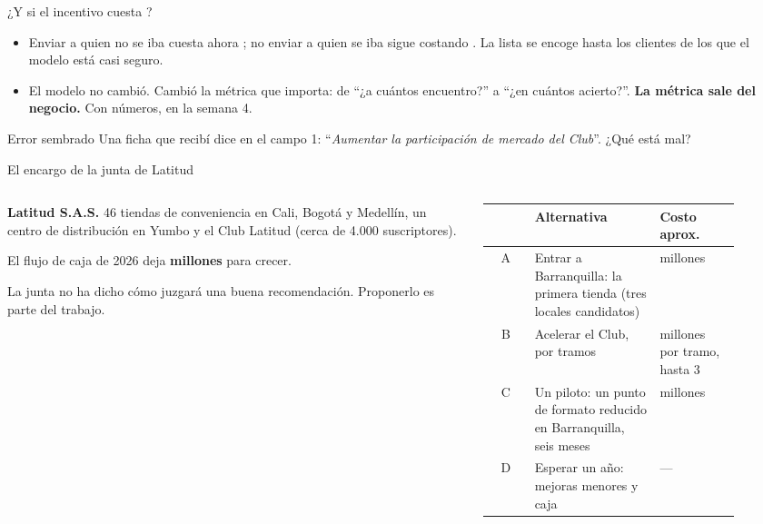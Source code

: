 \documentclass{beamer}
\begin{document}
\begin{frame}{¿Y si el incentivo cuesta ?}
\small
\begin{itemize}\itemsep3pt
  \item Enviar a quien no se iba cuesta ahora ; no enviar a quien se iba sigue costando . La lista se encoge hasta los clientes de los que el modelo está casi seguro.
  \item El modelo no cambió. Cambió la métrica que importa: de ``¿a cuántos encuentro?'' a ``¿en cuántos acierto?''. \textbf{La métrica sale del negocio.} Con números, en la semana 4.
\end{itemize}
\begin{alertblock}{Error sembrado}
Una ficha que recibí dice en el campo 1: ``\emph{Aumentar la participación de mercado del Club}''. ¿Qué está mal?
\end{alertblock}
\end{frame}

\begin{frame}{El encargo de la junta de Latitud}
\begin{columns}[T]
\begin{column}{0.45\textwidth}
\textbf{Latitud S.A.S.} 46 tiendas de conveniencia en Cali, Bogotá y Medellín, un centro de distribución en Yumbo y el Club Latitud (cerca de 4.000 suscriptores).

\medskip
El flujo de caja de 2026 deja \textbf{ millones} para crecer.

\medskip
La junta no ha dicho cómo juzgará una buena recomendación. Proponerlo es parte del trabajo.
\end{column}
\begin{column}{0.55\textwidth}
\footnotesize
\begin{tabular}{@{}c L{0.5\linewidth} L{0.32\linewidth}@{}}
\toprule
 & Alternativa & Costo aprox. \\
\midrule
A & Entrar a Barranquilla: la primera tienda (tres locales candidatos) &  millones \\
B & Acelerar el Club, por tramos &  millones por tramo, hasta 3 \\
C & Un piloto: un punto de formato reducido en Barranquilla, seis meses &  millones \\
D & Esperar un año: mejoras menores y caja & --- \\
\bottomrule
\end{tabular}
\end{column}
\end{columns}
\end{frame}
\end{document}
